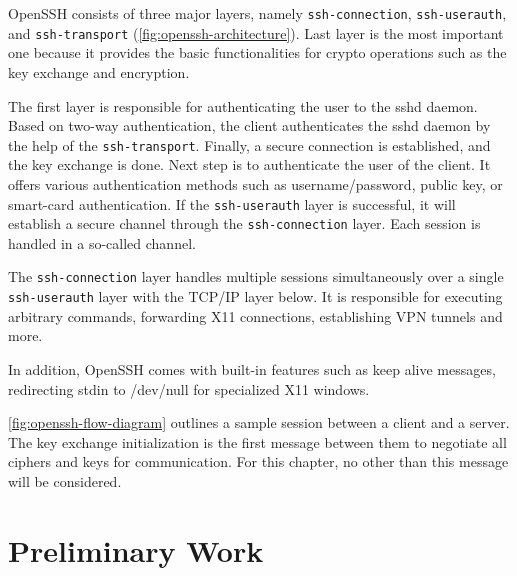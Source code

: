 OpenSSH consists of three major layers, namely \verb|ssh-connection|, \verb|ssh-userauth|, and \verb|ssh-transport| (\autoref{fig:openssh-architecture}).
Last layer is the most important one because it provides the basic functionalities for crypto operations such as the key exchange and encryption.

The first layer is responsible for authenticating the user to the sshd daemon.
Based on two-way authentication, the client authenticates the sshd daemon by the help of the \verb|ssh-transport|.
Finally, a secure connection is established, and the key exchange is done.
Next step is to authenticate the user of the client.
It offers various authentication methods such as username/password, public key, or smart-card authentication.
If the \verb|ssh-userauth| layer is successful, it will establish a secure channel through the \verb|ssh-connection| layer.
Each session is handled in a so-called channel.

The \verb|ssh-connection| layer handles multiple sessions simultaneously over a single \verb|ssh-userauth| layer with the TCP/IP layer below.
It is responsible for executing arbitrary commands, forwarding X11 connections, establishing VPN tunnels and more.

In addition, OpenSSH comes with built-in features such as keep alive messages, redirecting stdin to /dev/null for specialized X11 windows.

\autoref{fig:openssh-flow-diagram} outlines a sample session between a client and a server.
The key exchange initialization is the first message between them to negotiate all ciphers and keys for communication.
For this chapter, no other than this message will be considered.

\section{Preliminary Work}

